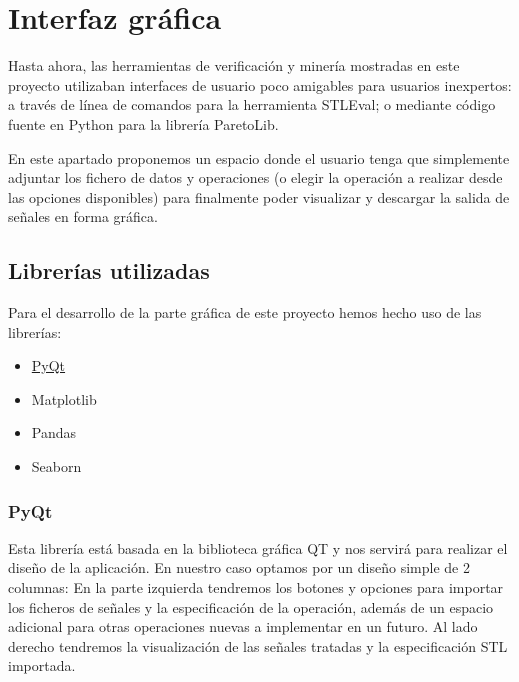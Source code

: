 \chapter{Interfaz gráfica}
\label{cha:gui}
 
Hasta ahora, las herramientas de verificación y minería mostradas en este proyecto utilizaban interfaces de usuario poco amigables para usuarios inexpertos: a través de línea de comandos para la herramienta STLEval; o mediante código fuente en Python para la librería ParetoLib.

En este apartado proponemos un espacio donde el usuario tenga que simplemente adjuntar los fichero de datos y operaciones (o elegir la operación a realizar desde las opciones disponibles) para finalmente poder visualizar y descargar la salida de señales en forma gráfica.
 
\section{Librerías utilizadas}

Para el desarrollo de la parte gráfica de este proyecto hemos hecho uso de las librerías:
\begin{itemize}
\item \href{https://www.qt.io/qt-for-python}{PyQt}
\item Matplotlib
\item Pandas
\item Seaborn
\end{itemize}
 
\subsection{PyQt}
Esta librería está basada en la biblioteca gráfica QT y nos servirá para realizar el diseño de la aplicación. En nuestro caso optamos por un diseño simple de 2 columnas: En la parte izquierda tendremos los botones y opciones para importar los ficheros de señales y la especificación de la operación, además de un espacio adicional para otras operaciones nuevas a implementar en un futuro. Al lado derecho tendremos la visualización de las señales tratadas y la especificación STL importada.

